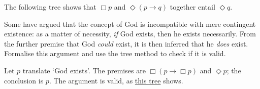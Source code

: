The following tree shows that $\Box p$ and $\Diamond(p \to q)$ together entail
$\Diamond q$.

\begin{center}
\end{center}

\begin{exercise}
  Some have argued that the concept of God is incompatible with mere contingent
  existence: as a matter of necessity, \emph{if} God exists, then he exists
  necessarily. From the further premise that God \emph{could} exist, it is then
  inferred that he \emph{does} exist. Formalise this argument and use the tree
  method to check if it is valid.
\end{exercise}
\begin{solution}
  Let $p$ translate `God exists'. The premises are $\Box(p \to \Box p)$ and
  $\Diamond p$; the conclusion is $p$. The argument is valid, as \href{https://www.umsu.de/trees/\#~8(p~5~8p),~9p~a=p.u}{this tree} shows.
\end{solution}


